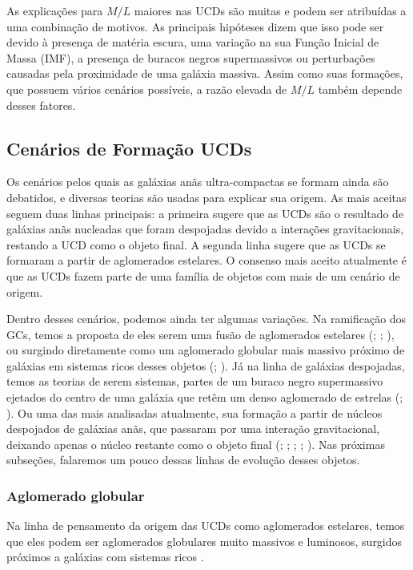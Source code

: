 As explicações para $M/L$ maiores nas UCDs são muitas e podem ser atribuídas a uma combinação de motivos. As principais hipóteses dizem que isso pode ser devido à presença de matéria escura, uma variação na sua Função Inicial de Massa (IMF), a presença de buracos negros supermassivos ou perturbações causadas pela proximidade de uma galáxia massiva. Assim como suas formações, que possuem vários cenários possíveis, a razão elevada de $M/L$ também depende desses fatores.

\subsection{Cenários de Formação UCDs}\label{subsec:formacao}

Os cenários pelos quais as galáxias anãs ultra-compactas se formam ainda são debatidos, e diversas teorias são usadas para explicar sua origem. As mais aceitas seguem duas linhas principais: a primeira sugere que as UCDs são o resultado de galáxias anãs nucleadas que foram despojadas devido a interações gravitacionais, restando a UCD como o objeto final. A segunda linha sugere que as UCDs se formaram a partir de aglomerados estelares. O consenso mais aceito atualmente é que as UCDs fazem parte de uma família de objetos com mais de um cenário de origem.

Dentro desses cenários, podemos ainda ter algumas variações. Na ramificação dos GCs, temos a proposta de eles serem uma fusão de aglomerados estelares (\citealp{Kroupa_1998}; \citealp{Fellhauer_2002}; \citealp{Br_ns_2012}), ou surgindo diretamente como um aglomerado globular mais massivo próximo de galáxias em sistemas ricos desses objetos (\citealp{Mieske_2002}; \citealp{Mieske_2011}). Já na linha de galáxias despojadas, temos as teorias de serem sistemas, partes de um buraco negro supermassivo ejetados do centro de uma galáxia que retêm um denso aglomerado de estrelas (\citealp{Merritt_2009}; \citealp{Leigh_2013}). Ou uma das mais analisadas atualmente, sua formação a partir de núcleos despojados de galáxias anãs, que passaram por uma interação gravitacional, deixando apenas o núcleo restante como o objeto final (\citealp{Bassino_1994}; \citealp{Bekki_2001}; \citealp{Drinkwater_2003}; \citealp{Goerdt_2008}; \citealp{Pfeffer_2013}). Nas próximas subseções, falaremos um pouco dessas linhas de evolução desses objetos.

\subsubsection{Aglomerado globular}\label{subsubsec:}
Na linha de pensamento da origem das UCDs como aglomerados estelares, temos que eles podem ser aglomerados globulares muito massivos e luminosos, surgidos próximos a galáxias com sistemas ricos \citep{Mieske_2002}.

